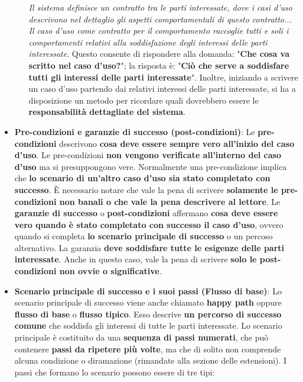 \documentclass[12pt]{article}
\begin{document}
\begin{itemize}
\begin{itemize}
        \textit{Il sistema definisce un contratto tra le parti interessate, dove i casi d'uso descrivono nel dettaglio gli aspetti comportamentali di questo contratto... \newline Il caso d'uso come contratto per il comportamento raccoglie tutti e soli i comportamenti relativi alla soddisfazione degli interessi delle parti interessate}.
        Questo consente di rispondere alla domanda: "\textbf{Che cosa va scritto nel caso d'uso?}"; la risposta è: "\textbf{Ciò che serve a soddisfare tutti gli interessi delle parti interessate}".
        Inoltre, iniziando a scrivere un caso d'uso partendo dai relativi interessi delle parti interessate, si ha a disposizione un metodo per ricordare quali dovrebbero essere le \textbf{responsabilità dettagliate del sistema}.
    \end{itemize}
    \item \textbf{Pre-condizioni e garanzie di successo (post-condizioni)}: Le \textbf{pre-condizioni} descrivono \textbf{cosa deve essere sempre vero all'inizio del caso d'uso}.
    Le pre-condizioni \textbf{non vengono verificate all'interno del caso d'uso} ma si presuppongono vere. Normalmente una pre-condizione implica che \textbf{lo scenario di un'altro caso d'uso sia stato completato con successo}.
    È necessario notare che vale la pena di scrivere \textbf{solamente le pre-condizioni non banali o che vale la pena descrivere al lettore}.
    Le \textbf{garanzie di successo} o \textbf{post-condizioni} affermano \textbf{cosa deve essere vero quando è stato completato con successo il caso d'uso}, ovvero quando si completa \textbf{lo scenario principale di successo} o un percoso alternativo.
    La garanzia \textbf{deve soddisfare tutte le esigenze delle parti interessate}. Anche in questo caso, vale la pena di scrivere \textbf{solo le post-condizioni non ovvie o significative}.
    \item \textbf{Scenario principale di successo e i suoi passi (Flusso di base)}: Lo scenario principale di successo viene anche chiamato \textbf{happy path} oppure \textbf{flusso di base} o \textbf{flusso tipico}.
    Esso descrive \textbf{un percorso di successo comune} che soddisfa gli interessi di tutte le parti interessate. Lo scenario principale è costituito da una \textbf{sequenza di passi numerati}, che può contenere \textbf{passi da ripetere più volte}, ma che di solito non comprende alcuna condizione o diramazione (rimandate alla sezione delle estensioni).
    I passi che formano lo scenario possono essere di tre tipi:
    \begin{enumerate}

\end{enumerate}
\end{itemize}
\end{document}
